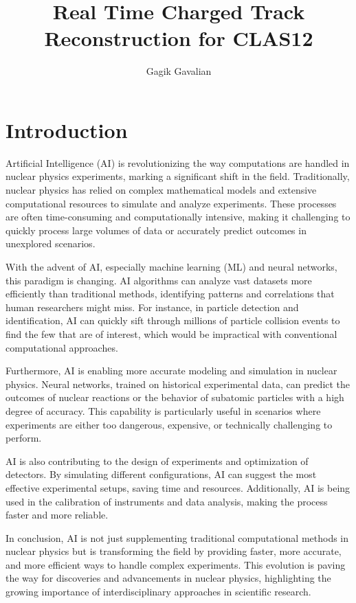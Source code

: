 \documentclass[a4paper,11pt]{article}
\title{Real Time Charged Track Reconstruction for CLAS12}
\author[a,1]{Gagik Gavalian}
\affiliation[a]{Jefferson Lab, Newport News, VA, USA}
\begin{document}
\maketitle


\section{Introduction}
\indent
Artificial Intelligence (AI) is revolutionizing the way computations are handled in nuclear physics experiments, marking a significant shift in the field. Traditionally, nuclear physics has relied on complex mathematical models and extensive computational resources to simulate and analyze experiments. These processes are often time-consuming and computationally intensive, making it challenging to quickly process large volumes of data or accurately predict outcomes in unexplored scenarios.

With the advent of AI, especially machine learning (ML) and neural networks, this paradigm is changing. AI algorithms can analyze vast datasets more efficiently than traditional methods, identifying patterns and correlations that human researchers might miss. For instance, in particle detection and identification, AI can quickly sift through millions of particle collision events to find the few that are of interest, which would be impractical with conventional computational approaches.

Furthermore, AI is enabling more accurate modeling and simulation in nuclear physics. Neural networks, trained on historical experimental data, can predict the outcomes of nuclear reactions or the behavior of subatomic particles with a high degree of accuracy. This capability is particularly useful in scenarios where experiments are either too dangerous, expensive, or technically challenging to perform.

AI is also contributing to the design of experiments and optimization of detectors. By simulating different configurations, AI can suggest the most effective experimental setups, saving time and resources. Additionally, AI is being used in the calibration of instruments and data analysis, making the process faster and more reliable.

In conclusion, AI is not just supplementing traditional computational methods in nuclear physics but is transforming the field by providing faster, more accurate, and more efficient ways to handle complex experiments. This evolution is paving the way for discoveries and advancements in nuclear physics, highlighting the growing importance of interdisciplinary approaches in scientific research.
\end{document}
